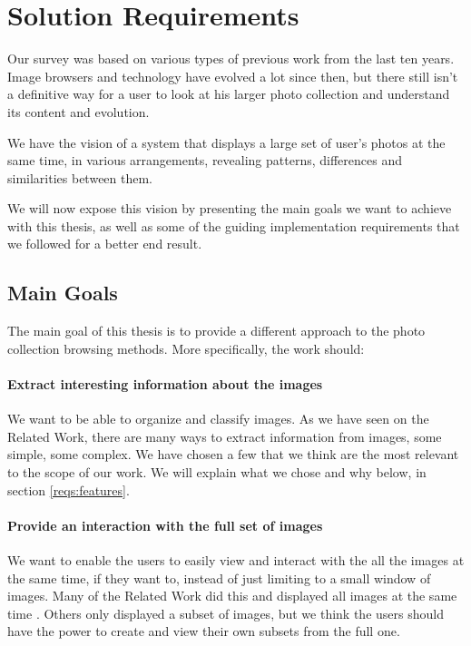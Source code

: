 \chapter{Solution Requirements} %
\label{chapter:solution_requirements}

Our survey was based on various types of previous work from the last ten years. Image browsers and technology have evolved a lot since then, but there still isn't a definitive way for a user to look at his larger photo collection and understand its content and evolution.



We have the vision of a system that displays a large set of user’s photos at the same time, in various arrangements, revealing patterns, differences and similarities between them.

We will now expose this vision by presenting the main goals we want to achieve with this thesis, as well as some of the guiding implementation requirements that we followed for a better end result.





\section{Main Goals} %
\label{reqs:main_goal}

The main goal of this thesis is to provide a different approach to the photo collection browsing methods. More specifically, the work should:


\subsubsection{Extract interesting information about the images}
We want to be able to organize and classify images. As we have seen on the Related Work, there are many ways to extract information from images, some simple, some complex. We have chosen a few that we think are the most relevant to the scope of our work. We will explain what we chose and why below, in section \ref{reqs:features}.


\subsubsection{Provide an interaction with the full set of images}
We want to enable the users to easily view and interact with the all the images at the same time, if they want to, instead of just limiting to a small window of images. Many of the Related Work did this and displayed all images at the same time \cite{Qiu:2007p1207,Chen:1998p2344,Girgensohn:2009:MOP:1502650.1502711,Bederson:2001:PZI:502348.502359}. Others only displayed a subset of images, but we think the users should have the power to create and view their own subsets from the full one.


